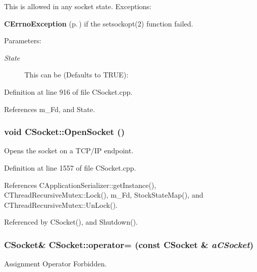 This is allowed in any socket state. Exceptions:\begin{CompactItemize}
\item 
{\bf CErrno\-Exception} {\rm (p.\,\pageref{classCErrnoException})} if the setsockopt(2) function failed.\end{CompactItemize}
\begin{Desc}
\item[Parameters: ]\par
\begin{description}
\item[{\em 
State}]This can be (Defaults to TRUE):
\end{description}
\end{Desc}


Definition at line 916 of file CSocket.cpp.

References m\_\-Fd, and State.
\subsubsection{\setlength{\rightskip}{0pt plus 5cm}void CSocket::Open\-Socket ()\hspace{0.3cm}{\tt  [protected]}}\label{classCSocket_b4}


Opens the socket on a TCP/IP endpoint. 

Definition at line 1557 of file CSocket.cpp.

References CApplication\-Serializer::get\-Instance(), CThread\-Recursive\-Mutex::Lock(), m\_\-Fd, Stock\-State\-Map(), and CThread\-Recursive\-Mutex::Un\-Lock().

Referenced by CSocket(), and Shutdown().
\subsubsection{\setlength{\rightskip}{0pt plus 5cm}CSocket\& CSocket::operator= (const CSocket \& {\em a\-CSocket})\hspace{0.3cm}{\tt  [private]}}\label{classCSocket_c1}


Assignment Operator Forbidden.


